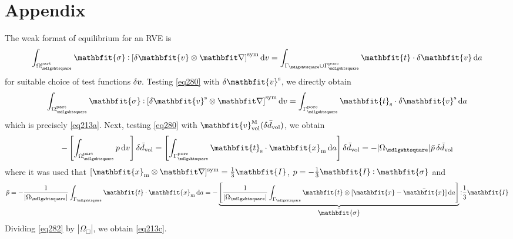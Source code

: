 \documentclass[10pt,a4paper]{article}
\renewcommand{\ta}[1]{\mathbfit{#1}}
\renewcommand{\ts}[1]{\mathbfit{#1}}
\renewcommand{\Box}{\mdlgwhtsquare}
\newcommand{\fluid}{\mathrm{part}}
\newcommand{\pore}{\mathrm{pore}}
\newcommand{\surf}{\mathrm{s}}
\begin{document}
\section{Appendix}

The weak format of equilibrium for an RVE is
\begin{equation}
    \int_{\Omega^\fluid_\Box} \ts{\sigma} \dprod \left[\delta \ta{v}\outerp\diff\right]^\sym \dif v =
    \int_{\Gamma_\Box\cup\Gamma_\Box^\pore} \ta{t} \cdot \delta\ta{v} \dif a
\label{eq280}
\end{equation}
for suitable choice of test functions $\delta \ta{v}$. Testing \eqref{eq280} with $\delta \ta{v}^\fluct$, we directly obtain
\begin{equation}
    \int_{\Omega^\fluid_\Box} \ts{\sigma} \dprod \left[\delta \ta{v}^\fluct\outerp\diff\right]^\sym \dif v =
    \int_{\Gamma_\Box^\pore} \ta{t}_\surf \cdot \delta\ta{v}^\fluct \dif a
\label{eq281}
\end{equation}
which is precisely \eqref{eq213a}. Next, testing \eqref{eq280} with $\ta{v}^\macro_\vol(\delta\bar{d}_\vol)$, we obtain
\begin{equation}
    - \left[\int_{\Omega^\fluid_\Box} p  \dif v \right]\delta\bar{d}_\vol =
    \left[\int_{\Gamma_\Box^\pore} \ta{t}_\surf \cdot \ta{x}_\mean \dif a\right]\delta\bar{d}_\vol =
    - |\Omega_\Box|\bar{p}\,\delta\bar{d}_\vol
\label{eq282}
\end{equation}
where it was used that $[\ta{x}_\mean\outerp\diff]^\sym=\frac{1}{3}\ts{I}$, $p=-\frac{1}{3}\ts{I}\dprod\ts{\sigma}$ and
\begin{equation}
    \bar{p} = - \frac{1}{|\Omega_\Box|} \int_{\Gamma_\Box} \ta{t} \cdot \ta{x}_\mean \dif a =
     - \underbrace{\left[\frac{1}{|\Omega_\Box|} \int_{\Gamma_\Box} \ta{t} \outerp [\ta{x}-\bar{\ta{x}}] \dif a\right]}_{\displaystyle\bar{\ts\sigma}}  \dprod \frac{1}{3}\ts{I}
\end{equation}
Dividing \eqref{eq282} by $|\Omega_\Box|$, we obtain \eqref{eq213c}.
\end{document}
